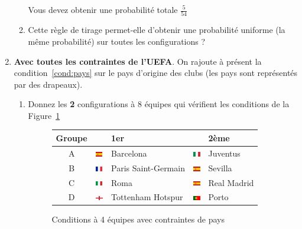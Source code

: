 \documentclass{../ficheTDTP}
\begin{document}
\begin{enumerate}
\begin{enumerate}
Vous devez obtenir une probabilité totale $\frac{5}{54}$

\item Cette règle de tirage permet-elle d'obtenir une probabilité uniforme (la même probabilité) sur toutes les configurations ?
\end{enumerate}

\item \textbf{Avec toutes les contraintes de l'UEFA}. On rajoute à présent la condition~\eqref{cond:pays} sur le pays d'origine des clubs (les pays sont représentés par des drapeaux).

\begin{enumerate}
\item Donnez les \textbf{2} configurations à 8 équipes qui vérifient les conditions de la Figure~\ref{fig:ex4-pays}

\begin{figure}[ht]
\begin{tabular}{|c|ll|ll|}
\hline
Groupe & & 1er & & 2ème \\ \hline
A & \includegraphics[height=0.2cm]{flags/es.png} & Barcelona & \includegraphics[height=0.2cm]{flags/it.png} & Juventus \\ \hline
B & \includegraphics[height=0.2cm]{flags/fr.png} & Paris Saint-Germain & \includegraphics[height=0.2cm]{flags/es.png} & Sevilla \\ \hline
C & \includegraphics[height=0.2cm]{flags/it.png} & Roma & \includegraphics[height=0.2cm]{flags/es.png} & Real Madrid \\ \hline
D & \includegraphics[height=0.2cm]{flags/en.png} & Tottenham Hotspur & \includegraphics[height=0.2cm]{flags/po.png} & Porto \\ \hline
\end{tabular}
\caption{Conditions à 4 équipes avec contraintes de pays}
\label{fig:ex4-pays}


\end{figure}
\end{enumerate}
\end{enumerate}
\end{document}
